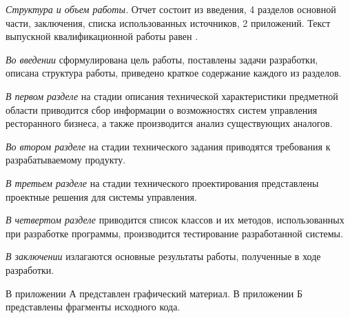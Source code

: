 \emph{Структура и объем работы.} Отчет состоит из введения, 4 разделов основной части, заключения, списка использованных источников, 2 приложений. Текст выпускной квалификационной работы равен .

\emph{Во введении} сформулирована цель работы, поставлены задачи разработки, описана структура работы, приведено краткое содержание каждого из разделов.

\emph{В первом разделе} на стадии описания технической характеристики предметной области приводится сбор информации о возможностях систем управления ресторанного бизнеса, а также производится анализ существующих аналогов.

\emph{Во втором разделе} на стадии технического задания приводятся требования к разрабатываемому продукту.

\emph{В третьем разделе} на стадии технического проектирования представлены проектные решения для системы управления.

\emph{В четвертом разделе} приводится список классов и их методов, использованных при разработке программы, производится тестирование разработанной системы.

\emph{ В заключении} излагаются основные результаты работы, полученные в ходе разработки.

В приложении А представлен графический материал.
В приложении Б представлены фрагменты исходного кода. 
